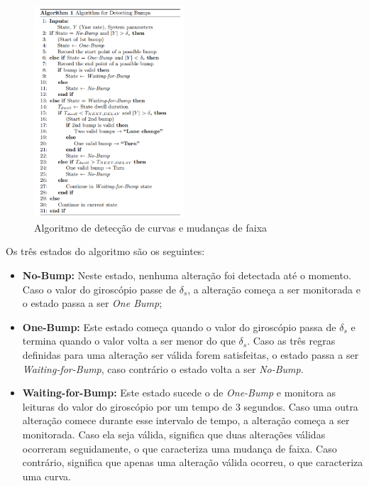 \begin{figure}[h]
  \centering
  \includegraphics[width=0.5\textwidth]{images/algoritmo-giroscopio.png}
  \caption{Algoritmo de detecção de curvas e mudanças de faixa \cite{chen2015invisible}}
  \label{algoritmo-giroscopio}
\end{figure}

Os três estados do algoritmo são os seguintes:

\begin{itemize}
  \item \textbf{No-Bump:} Neste estado, nenhuma alteração foi detectada até o momento. Caso o valor do giroscópio passe de $\delta_{s}$, a alteração começa a ser
  monitorada e o estado passa a ser \textit{One Bump};
  \item \textbf{One-Bump:} Este estado começa quando o valor do giroscópio passa de $\delta_{s}$ e termina quando o valor volta a ser menor do que $\delta_{s}$.
  Caso as três regras definidas para uma alteração ser válida forem satisfeitas, o estado passa a ser \textit{Waiting-for-Bump}, caso contrário o estado volta
  a ser \textit{No-Bump}.
  \item \textbf{Waiting-for-Bump:} Este estado sucede o de \textit{One-Bump} e monitora as leituras do valor do giroscópio por um tempo de 3 segundos. Caso
  uma outra alteração comece durante esse intervalo de tempo, a alteração começa a ser monitorada. Caso ela seja válida, significa que duas alterações válidas
  ocorreram seguidamente, o que caracteriza uma mudança de faixa. Caso contrário, significa que apenas uma alteração válida ocorreu, o que caracteriza uma curva.
\end{itemize}

